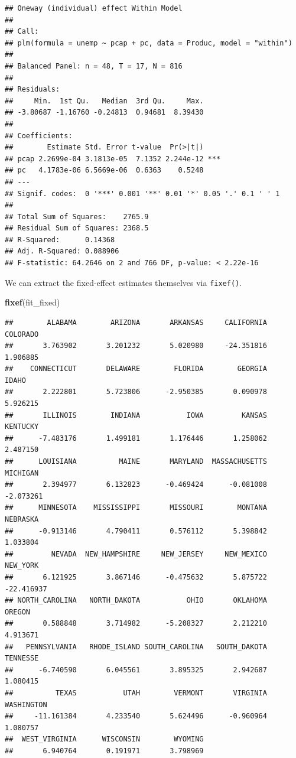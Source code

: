 \documentclass[
  12pt,
  oneside,openany]{book}
\newenvironment{Shaded}{\begin{snugshade}}{\end{snugshade}}
\newcommand{\KeywordTok}[1]{\textcolor[rgb]{0.13,0.29,0.53}{\textbf{#1}}}
\newcommand{\NormalTok}[1]{#1}
\begin{document}
\begin{verbatim}
## Oneway (individual) effect Within Model
## 
## Call:
## plm(formula = unemp ~ pcap + pc, data = Produc, model = "within")
## 
## Balanced Panel: n = 48, T = 17, N = 816
## 
## Residuals:
##     Min.  1st Qu.   Median  3rd Qu.     Max. 
## -3.80687 -1.16760 -0.24813  0.94681  8.39430 
## 
## Coefficients:
##        Estimate Std. Error t-value  Pr(>|t|)    
## pcap 2.2699e-04 3.1813e-05  7.1352 2.244e-12 ***
## pc   4.1783e-06 6.5669e-06  0.6363    0.5248    
## ---
## Signif. codes:  0 '***' 0.001 '**' 0.01 '*' 0.05 '.' 0.1 ' ' 1
## 
## Total Sum of Squares:    2765.9
## Residual Sum of Squares: 2368.5
## R-Squared:      0.14368
## Adj. R-Squared: 0.088906
## F-statistic: 64.2646 on 2 and 766 DF, p-value: < 2.22e-16
\end{verbatim}

We can extract the fixed-effect estimates themselves via \texttt{fixef()}.

\begin{Shaded}
\begin{Highlighting}[]
\KeywordTok{fixef}\NormalTok{(fit\_fixed)}
\end{Highlighting}
\end{Shaded}

\begin{verbatim}
##        ALABAMA        ARIZONA       ARKANSAS     CALIFORNIA       COLORADO 
##       3.763902       3.201232       5.020980     -24.351816       1.906885 
##    CONNECTICUT       DELAWARE        FLORIDA        GEORGIA          IDAHO 
##       2.222801       5.723806      -2.950385       0.090978       5.926215 
##       ILLINOIS        INDIANA           IOWA         KANSAS       KENTUCKY 
##      -7.483176       1.499181       1.176446       1.258062       2.487150 
##      LOUISIANA          MAINE       MARYLAND  MASSACHUSETTS       MICHIGAN 
##       2.394977       6.132823      -0.469424      -0.081008      -2.073261 
##      MINNESOTA    MISSISSIPPI       MISSOURI        MONTANA       NEBRASKA 
##      -0.913146       4.790411       0.576112       5.398842       1.033804 
##         NEVADA  NEW_HAMPSHIRE     NEW_JERSEY     NEW_MEXICO       NEW_YORK 
##       6.121925       3.867146      -0.475632       5.875722     -22.416937 
## NORTH_CAROLINA   NORTH_DAKOTA           OHIO       OKLAHOMA         OREGON 
##       0.588848       3.714982      -5.208327       2.212210       4.913671 
##   PENNSYLVANIA   RHODE_ISLAND SOUTH_CAROLINA   SOUTH_DAKOTA       TENNESSE 
##      -6.740590       6.045561       3.895325       2.942687       1.080415 
##          TEXAS           UTAH        VERMONT       VIRGINIA     WASHINGTON 
##     -11.161384       4.233540       5.624496      -0.960964       1.080757 
##  WEST_VIRGINIA      WISCONSIN        WYOMING 
##       6.940764       0.191971       3.798969
\end{verbatim}
\end{document}
